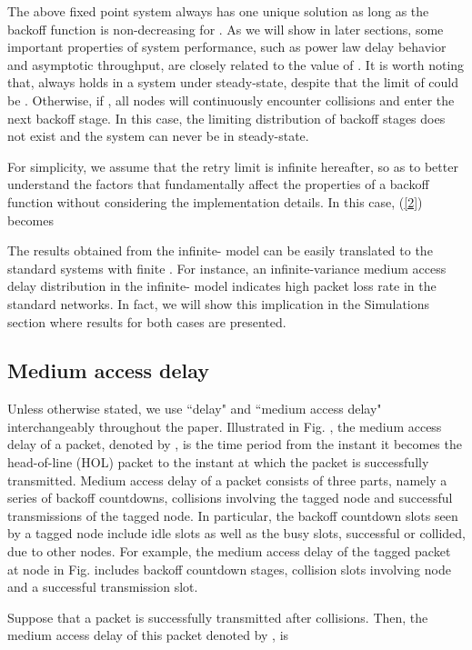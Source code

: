\documentclass[journal]{IEEEtran}
\begin{document}
The above fixed point system always has one unique solution as long as the backoff function  is non-decreasing for  \cite{2007:Kumar}. As we will show in later sections, some important properties of system performance, such as power law delay behavior and asymptotic throughput, are closely related to the value of . It is worth noting that,  always holds in a system under steady-state, despite that the limit of  could be . Otherwise, if , all nodes will continuously encounter collisions and enter the next backoff stage. In this case, the limiting distribution of backoff stages does not exist and the system can never be in steady-state.

For simplicity, we assume that the retry limit  is infinite hereafter, so as to better understand the factors that fundamentally affect the properties of a backoff function without considering the implementation details. In this case, (\ref{2}) becomes

The results obtained from the infinite- model can be easily translated to the standard systems with finite . For instance, an infinite-variance medium access delay distribution in the infinite- model indicates high packet loss rate in the standard networks. In fact, we will show this implication in the Simulations section where results for both cases are presented.

\subsection{Medium access delay}
Unless otherwise stated, we use ``delay" and ``medium access delay" interchangeably throughout the paper. Illustrated in Fig. , the medium access delay of a packet, denoted by , is the time period from the instant it becomes the head-of-line (HOL) packet to the instant at which the packet is successfully transmitted. Medium access delay of a packet consists of three parts, namely a series of backoff countdowns, collisions involving the tagged node and successful transmissions of the tagged node\cite{2010:Zhang}. In particular, the backoff countdown slots seen by a tagged node include idle slots as well as the busy slots, successful or collided, due to other nodes. For example, the medium access delay of the tagged packet at node  in Fig.  includes  backoff countdown stages,  collision slots involving node  and a successful transmission slot.

Suppose that a packet is successfully transmitted after  collisions. Then, the medium access delay of this packet denoted by , is
\end{document}
